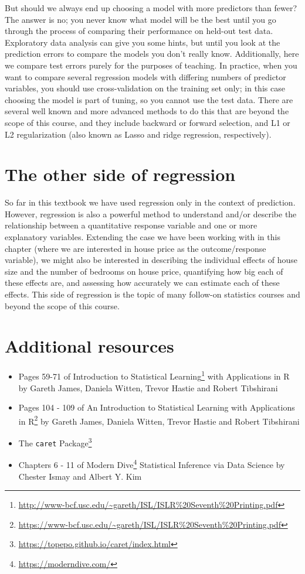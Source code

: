 \documentclass[
]{krantz}
\providecommand{\tightlist}{%
  \setlength{\itemsep}{0pt}\setlength{\parskip}{0pt}}
\renewcommand{\href}[2]{#2\footnote{\url{#1}}}
\begin{document}
But should we always end up choosing a model with more predictors than fewer?
The answer is no; you never know what model will be the best until you go through the
process of comparing their performance on held-out test data. Exploratory
data analysis can give you some hints, but until you look
at the prediction errors to compare the models you don't really know.
Additionally, here we compare test errors purely for the purposes of teaching.
In practice, when you want to compare several regression models with
differing numbers of predictor variables, you should use
cross-validation on the training set only; in this case choosing the model is part
of tuning, so you cannot use the test data. There are several well known and more advanced
methods to do this that are beyond the scope of this course, and they include
backward or forward selection, and L1 or L2 regularization (also known as Lasso
and ridge regression, respectively).

\hypertarget{the-other-side-of-regression}{%
\section{The other side of regression}\label{the-other-side-of-regression}}

So far in this textbook we have used regression only in the context of
prediction. However, regression is also a powerful method to understand and/or
describe the relationship between a quantitative response variable and
one or more explanatory variables. Extending the case we have been working with
in this chapter (where we are interested in house price as the outcome/response
variable), we might also be interested in describing the
individual effects of house size and the number of bedrooms on house price,
quantifying how big each of these effects are, and assessing how accurately we
can estimate each of these effects. This side of regression is the topic of
many follow-on statistics courses and beyond the scope of this course.

\hypertarget{additional-resources-3}{%
\section{Additional resources}\label{additional-resources-3}}

\begin{itemize}
\tightlist
\item
  Pages 59-71 of \href{http://www-bcf.usc.edu/~gareth/ISL/ISLR\%20Seventh\%20Printing.pdf}{Introduction to Statistical Learning} with Applications in R by Gareth James, Daniela Witten, Trevor Hastie and Robert Tibshirani
\item
  Pages 104 - 109 of \href{https://www-bcf.usc.edu/~gareth/ISL/ISLR\%20Seventh\%20Printing.pdf}{An Introduction to Statistical Learning with Applications in R} by Gareth James, Daniela Witten, Trevor Hastie and Robert Tibshirani
\item
  \href{https://topepo.github.io/caret/index.html}{The \texttt{caret} Package}
\item
  Chapters 6 - 11 of \href{https://moderndive.com/}{Modern Dive} Statistical Inference via Data Science by Chester Ismay and Albert Y. Kim
\end{itemize}
\end{document}
